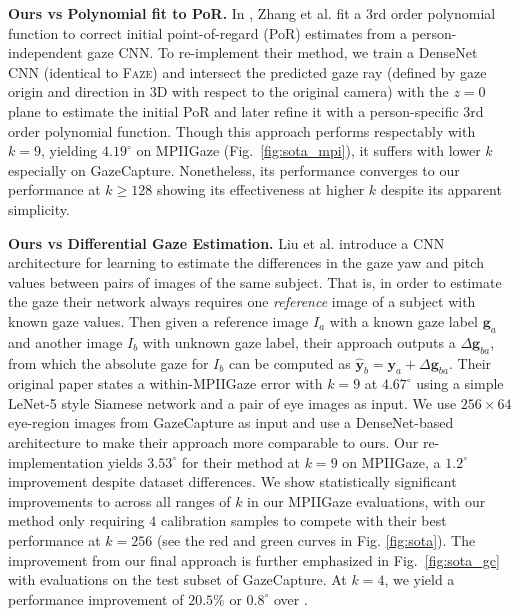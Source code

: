 \documentclass[10pt,twocolumn,letterpaper]{article}
\newcommand{\faze}[0]{\textsc{Faze}\xspace}
\newcommand{\Paragraph}[1]
{\vspace{1.5mm} \noindent \textbf{#1}}
\begin{document}
\Paragraph{Ours vs Polynomial fit to PoR.} In \cite{Zhang2019CHI}, Zhang et al. fit a 3rd order polynomial function to correct initial point-of-regard (PoR) 
estimates from a person-independent gaze CNN.
To re-implement their method, we train a DenseNet CNN (identical to \faze) and intersect the predicted gaze ray (defined by gaze origin and direction in 3D with respect to the original camera) with the $z=0$ plane to estimate the initial PoR and later refine it with a person-specific 3rd order polynomial function.
Though this approach performs respectably with $k=9$, yielding $4.19^\circ$ on MPIIGaze (Fig.~\ref{fig:sota_mpi}), it suffers with lower $k$ especially on GazeCapture.
Nonetheless, its performance converges to our performance at $k\geq 128$ showing its effectiveness at higher $k$ despite its apparent simplicity.

\Paragraph{Ours vs Differential Gaze Estimation.}
Liu et al. \cite{Liu2018BMVC} introduce a CNN architecture for learning to estimate the differences in the gaze yaw and pitch values between pairs of images of the same subject.
That is, in order to estimate the gaze their network always requires one \emph{reference} image of a subject with known gaze values. Then given a reference image $I_a$ with a known gaze label $\mathbf{g}_a$ and another image $I_b$ with unknown gaze label, their approach outputs a $\Delta\mathbf{g}_{ba}$, from which the absolute gaze for $I_b$ can be computed as $\hat{\mathbf{y}}_b=\mathbf{y}_a+\Delta\mathbf{g}_{ba}$.
Their original paper states a within-MPIIGaze error with $k=9$ at $4.67^\circ$ using a simple LeNet-5 style Siamese network and a pair of eye images as input.
We use $256\times 64$ eye-region images from GazeCapture as input and use a DenseNet-based architecture to make their approach more comparable to ours.
Our re-implementation yields $3.53^\circ$ for their method at $k = 9$ on MPIIGaze, a $1.2^\circ$ improvement despite dataset differences.
We show statistically significant improvements to \cite{Liu2018BMVC} across all ranges of $k$ in our MPIIGaze evaluations, with our method only requiring $4$ calibration samples to compete with their best performance at $k=256$ (see the red and green curves in Fig. \ref{fig:sota}).
The improvement from our final approach is further emphasized in Fig.~\ref{fig:sota_gc} with evaluations on the test subset of GazeCapture.
At $k=4$, we yield a performance improvement of $20.5\%$ or $0.8^\circ$ over \cite{Liu2018BMVC}.
 
\end{document}
